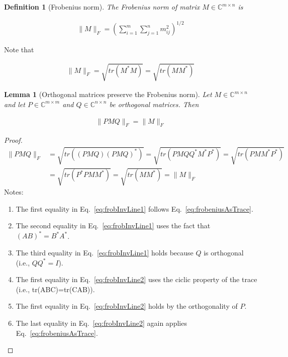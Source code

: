 \documentclass[12pt]{article}
\newtheorem{definition}{Definition}
\newtheorem{lemma}{Lemma}
\begin{document}
\begin{appendices}
    \begin{definition}[Frobenius norm]
        The Frobenius norm of matrix $M\in\mathbb{C}^{m\times n}$ is

        \begin{align}
            \|M\|_F=\left(\sum_{i=1}^m\sum_{j=1}^nm_{ij}^2\right)^{1/2}
        \end{align}
        \label{def:frobeniusNorm}

    \end{definition}

    Note that

    \begin{align}
        \|M\|_F=\sqrt{tr(M^*M)}=\sqrt{tr(MM^*)}
        \label{eq:frobeniusAsTrace}
    \end{align}

    \begin{lemma}[Orthogonal matrices preserve the Frobenius norm]
        Let $M\in\mathbb{C}^{m\times n}$ and let $P\in\mathbb{C}^{m\times m}$
        and $Q\in\mathbb{C}^{n\times n}$ be orthogonal matrices. Then

        \begin{align}
            \|PMQ\|_F=\|M\|_F
        \end{align}

        \label{lemma:orthogonalPreserveF}
    \end{lemma}

    \begin{proof}
        \begin{align}
            \|PMQ\|_F&=\sqrt{tr((PMQ)(PMQ)^*)}=\sqrt{tr(PMQQ^*M^*P^*)}=\sqrt{tr(PMM^*P^*)\label{eq:frobInvLine1}}\\
                     &=\sqrt{tr(P^*PMM^*)}=\sqrt{tr(MM^*)}=\|M\|_F\label{eq:frobInvLine2}
        \end{align}
        Notes:
        \begin{enumerate}
            \item The first equality in Eq.~\ref{eq:frobInvLine1} follows
                Eq.~\ref{eq:frobeniusAsTrace}.
            \item The second equality in Eq.~\ref{eq:frobInvLine1} uses the fact
                that $(AB)^*=B^*A^*$.
            \item The third equality in Eq.~\ref{eq:frobInvLine1} holds because
                $Q$ is orthogonal (i.e., $QQ^*=I$).
            \item The first equality in Eq.~\ref{eq:frobInvLine2} uses the
                ciclic property of the trace (i.e., tr(ABC)=tr(CAB)).
            \item The first equality in Eq.~\ref{eq:frobInvLine2} holds by the
                orthogonality of $P$.
            \item The last equality in Eq.~\ref{eq:frobInvLine2} again applies
                Eq.~\ref{eq:frobeniusAsTrace}.
        \end{enumerate}
    \end{proof}


\end{appendices}
\end{document}
